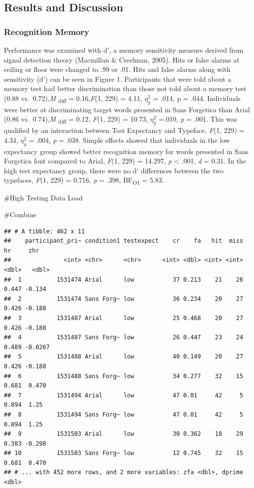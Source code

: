 \documentclass[
  english,
  man]{apa6}
\begin{document}
\hypertarget{results-and-discussion}{%
\subsection{Results and Discussion}\label{results-and-discussion}}

\hypertarget{recognition-memory}{%
\subsubsection{Recognition Memory}\label{recognition-memory}}

Performance was examined with d', a memory sensitivity measure derived from signal detection theory (Macmillan \& Creelman, 2005). Hits or false alarms at ceiling or floor were changed to .99 or .01. Hits and false alarms along with sensitivity (d') can be seen in Figure 1. Participants that were told about a memory test had better discrimination than those not told about a memory test (0.88 vs.~0.72),\emph{M} \textsubscript{diff} = 0.16,\emph{F}(1, 229) = 4.11, \(\eta_{g}^{2}\) = .014, p = .044. Individuals were better at discriminating target words presented in Sans Forgetica than Arial (0.86 vs.~0.74),\emph{M} \textsubscript{diff} = 0.12, \emph{F}(1, 229) = 10.73, \(\eta_{g}^{2}\) =.010, \emph{p} = .001. This was qualified by an interaction between Test Expectancy and Typeface, \emph{F}(1, 229) = 4.34, \(\eta_{g}^{2}\) = .004, \emph{p} = .038. Simple effects showed that individuals in the low expectancy group showed better recognition memory for words presented in Sans Forgetica font compared to Arial, \emph{F}(1, 229) = 14.297, \emph{p} \textless{} .001, \emph{d} = 0.31. In the high test expectancy group, there were no d` differences between the two typefaces, \emph{F}(1, 229) = 0.716, \emph{p} = .398, BF\textsubscript{O1} = 5.83.

\#High Testing Data Load

\#Combine

\begin{verbatim}
## # A tibble: 462 x 11
##    participant_pri~ condition1 testexpect    cr    fa   hit  miss    hr     zhr
##               <int> <chr>      <chr>      <int> <dbl> <int> <int> <dbl>   <dbl>
##  1          1531474 Arial      low           37 0.213    21    26 0.447 -0.134 
##  2          1531474 Sans Forg~ low           36 0.234    20    27 0.426 -0.188 
##  3          1531487 Arial      low           25 0.468    20    27 0.426 -0.188 
##  4          1531487 Sans Forg~ low           26 0.447    23    24 0.489 -0.0267
##  5          1531488 Arial      low           40 0.149    20    27 0.426 -0.188 
##  6          1531488 Sans Forg~ low           34 0.277    32    15 0.681  0.470 
##  7          1531494 Arial      low           47 0.01     42     5 0.894  1.25  
##  8          1531494 Sans Forg~ low           47 0.01     42     5 0.894  1.25  
##  9          1531503 Arial      low           30 0.362    18    29 0.383 -0.298 
## 10          1531503 Sans Forg~ low           12 0.745    32    15 0.681  0.470 
## # ... with 452 more rows, and 2 more variables: zfa <dbl>, dprime <dbl>
\end{verbatim}
\end{document}
